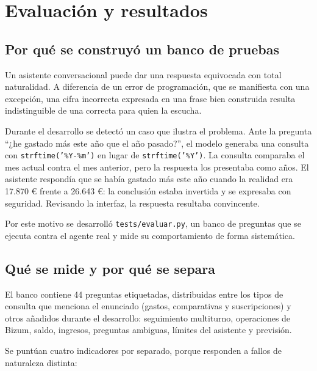 \section{Evaluación y resultados}

\subsection{Por qué se construyó un banco de pruebas}

Un asistente conversacional puede dar una respuesta equivocada con total
naturalidad. A diferencia de un error de programación, que se manifiesta con
una excepción, una cifra incorrecta expresada en una frase bien construida
resulta indistinguible de una correcta para quien la escucha.

Durante el desarrollo se detectó un caso que ilustra el problema. Ante la
pregunta ``¿he gastado más este año que el año pasado?'', el modelo generaba una
consulta con \texttt{strftime('\%Y-\%m')} en lugar de \texttt{strftime('\%Y')}.
La consulta comparaba el mes actual contra el mes anterior, pero la respuesta
los presentaba como años. El asistente respondía que se había gastado más este
año cuando la realidad era 17.870 € frente a 26.643 €: la conclusión estaba
invertida y se expresaba con seguridad. Revisando la interfaz, la respuesta
resultaba convincente.

Por este motivo se desarrolló \texttt{tests/evaluar.py}, un banco de preguntas
que se ejecuta contra el agente real y mide su comportamiento de forma
sistemática.

\subsection{Qué se mide y por qué se separa}

El banco contiene 44 preguntas etiquetadas, distribuidas entre los tipos de
consulta que menciona el enunciado (gastos, comparativas y suscripciones) y
otros añadidos durante el desarrollo: seguimiento multiturno, operaciones de
Bizum, saldo, ingresos, preguntas ambiguas, límites del asistente y previsión.

Se puntúan cuatro indicadores por separado, porque responden a fallos de
naturaleza distinta:

